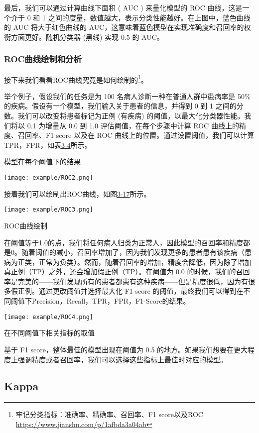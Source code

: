 最后，我们可以通过计算曲线下面积 ( AUC ) 来量化模型的 ROC 曲线，这是一个介于 0 和 1 之间的度量，数值越大，表示分类性能越好。在上图中，蓝色曲线的 AUC 将大于红色曲线的 AUC，这意味着蓝色模型在实现准确度和召回率的权衡方面更好。随机分类器 (黑线) 实现 0.5 的 AUC。

\subsubsection{ROC曲线绘制和分析}

接下来我们看看ROC曲线究竟是如何绘制的\footnote{牢记分类指标：准确率、精确率、召回率、F1 score以及ROC \url{https://www.jianshu.com/p/1afbda3a04ab}}。

举个例子，假设我们的任务是为 100 名病人诊断一种在普通人群中患病率是 50$\%$ 的疾病。假设有一个模型，我们输入关于患者的信息，并得到 0 到 1 之间的分数。我们可以改变将患者标记为正例 (有疾病) 的阈值，以最大化分类器性能。我们将以 0.1 为增量从 0.0 到 1.0 评估阈值，在每个步骤中计算 ROC 曲线上的精度、召回率、F1 score 以及在 ROC 曲线上的位置。通过设置阈值，我们可以计算TPR，FPR，如表\href{tab:3-4}{3-4}所示。
\begin{table}[!htp]
\centering
\caption{模型在每个阈值下的结果}
\texttt{[image: example/ROC2.png]}
\label{fig1:3-15}
\end{table}

接着我们可以绘制出ROC曲线，如图\href{fig1:3-17}{3-17}所示。
\begin{table}[!htp]
\centering
\texttt{[image: example/ROC3.png]}
\caption{ROC曲线绘制}
\label{fig1:3-17}
\end{table}

在阈值等于1.0的点，我们将任何病人归类为正常人，因此模型的召回率和精度都是0。随着阈值的减小，召回率增加了，因为我们发现更多的患者患有该疾病（患病为正类，正常为负类）。然而，随着召回率的增加，精度会降低，因为除了增加真正例（TP）之外，还会增加假正例（TP）。在阈值为 0.0 的时候，我们的召回率是完美的——我们发现所有的患者都患有这种疾病——但是精度很低，因为有很多假正例。通过更改阈值并选择最大化 F1 score 的阈值，最终我们可以得到在不同阈值下Precision，Recall，TPR，FPR，F1-Score的结果。

\begin{table}[!htp]
\centering
\texttt{[image: example/ROC4.png]}
\caption{在不同阈值下相关指标的取值}
\label{fig1:3-17}
\end{table}

基于 F1 score，整体最佳的模型出现在阈值为 0.5 的地方。如果我们想要在更大程度上强调精度或者召回率，我们可以选择这些指标上最佳时对应的模型。

\subsection{Kappa}

